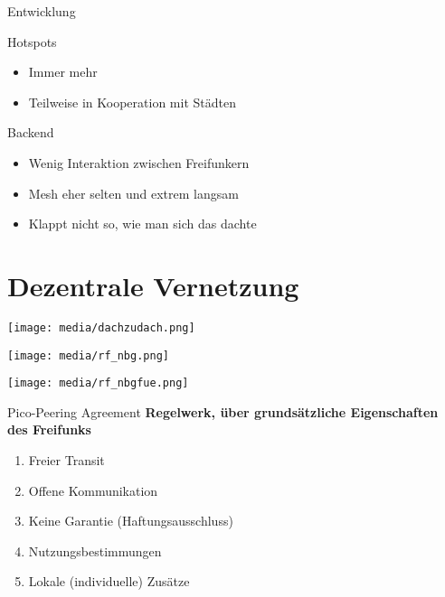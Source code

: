 \documentclass{beamer}
\begin{document}
	\begin{frame}{Entwicklung}
		\begin{block}{Hotspots}
			\begin{itemize}
				\item Immer mehr
				\item Teilweise in Kooperation mit Städten
			\end{itemize}
		\end{block}
		\vspace{1em}
		\pause
		\begin{block}{Backend}
			\begin{itemize}
				\item Wenig Interaktion zwischen Freifunkern
				\item Mesh eher selten und extrem langsam
				\item Klappt nicht so, wie man sich das dachte
			\end{itemize}
		\end{block}
	\end{frame}


	\section{Dezentrale Vernetzung}
	\begin{frame}
		\texttt{[image: media/dachzudach.png]}
	\end{frame}
	\begin{frame}
		\texttt{[image: media/rf\_nbg.png]}
	\end{frame}
	\begin{frame}
		\texttt{[image: media/rf\_nbgfue.png]}
	\end{frame}

	\begin{frame}{Pico-Peering Agreement}
		\textbf{Regelwerk, über grundsätzliche Eigenschaften des Freifunks}

		\begin{enumerate}
			\item Freier Transit
			\item Offene Kommunikation
			\item Keine Garantie (Haftungsausschluss)
			\item Nutzungsbestimmungen
			\item Lokale (individuelle) Zusätze
		\end{enumerate}
	\end{frame}
\end{document}
